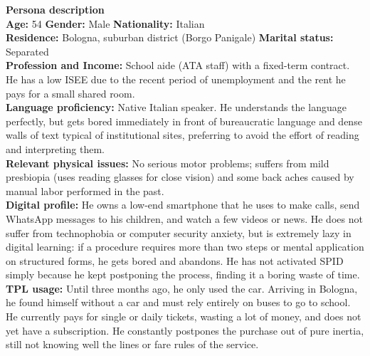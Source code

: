﻿\documentclass[11pt,a4paper]{article}
\begin{document}
\begin{tcolorbox}[base]
    \textbf{Persona description} \\[4pt]
    {\small
    \textbf{Age:} 54 \hfill
    \textbf{Gender:} Male \hfill
    \textbf{Nationality:} Italian
    \\[2pt]
    \textbf{Residence:} Bologna, suburban district (Borgo Panigale) \hfill
    \textbf{Marital status:} Separated \\[2pt]
    \textbf{Profession and Income:} School aide (ATA staff) with a fixed-term contract. He has a low ISEE due to the recent period of unemployment and the rent he pays for a small shared room. \\[2pt]
    \textbf{Language proficiency:} Native Italian speaker. He understands the language perfectly, but gets bored immediately in front of bureaucratic language and dense walls of text typical of institutional sites, preferring to avoid the effort of reading and interpreting them. \\[2pt]
    \textbf{Relevant physical issues:} No serious motor problems; suffers from mild presbiopia (uses reading glasses for close vision) and some back aches caused by manual labor performed in the past. \\[2pt]
    \textbf{Digital profile:} He owns a low-end smartphone that he uses to make calls, send WhatsApp messages to his children, and watch a few videos or news. He does not suffer from technophobia or computer security anxiety, but is extremely lazy in digital learning: if a procedure requires more than two steps or mental application on structured forms, he gets bored and abandons. He has not activated SPID simply because he kept postponing the process, finding it a boring waste of time. \\[2pt]
    \textbf{TPL usage:} Until three months ago, he only used the car. Arriving in Bologna, he found himself without a car and must rely entirely on buses to go to school. He currently pays for single or daily tickets, wasting a lot of money, and does not yet have a subscription. He constantly postpones the purchase out of pure inertia, still not knowing well the lines or fare rules of the service.
    }
\end{tcolorbox}

\vspace{0.3cm}

\end{document}
